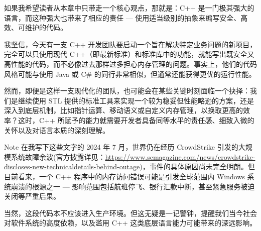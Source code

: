 如果我希望读者从本章中只带走一个核心观点，那就是：C++ 是一门极其强大的语言，而这种强大也带来了相应的责任 --- 使用适当级别的抽象来编写安全、高效、可维护的代码。

我坚信，今天有一支 C++ 开发团队要启动一个旨在解决特定业务问题的新项目，完全可以只使用现代 C++（即最新标准）和标准库中的功能，就能写出既安全又高性能的代码，而不必像过去那样过多担心内存管理的问题。事实上，他们的代码风格可能与使用 Java 或 C\# 的同行非常相似，但通常还能获得更优的运行性能。

然而，即便是这样一支现代化的团队，也可能会在某些关键时刻面临一个抉择：我们是继续使用 STL 提供的标准工具来实现一个较为稳妥但性能略逊的方案，还是深入到底层机制，比如指针运算、移动语义或自定义内存管理，以换取更高的效率？这时，C++ 所赋予的能力就需要开发者具备同等水平的责任感、细致入微的关怀以及对语言本质的深刻理解。

\begin{myNotic}{Note}
在我写下这些文字的 2024 年 7 月，世界仍在经历 CrowdStrike 引发的大规模系统故障余波(官方披露详见：\url{https://www.scmagazine.com/news/crowdstrike-discloses-new-technicaldetails-behind-outage})，事件的具体原因尚未完全明朗。但目前看来，一个 C++ 程序中的内存访问错误可能是引发全球范围内 Windows 系统崩溃的根源之一 --- 影响范围包括航班停飞、银行汇款中断，甚至紧急服务被迫关闭等严重后果。

当然，这段代码本不应该进入生产环境。但这无疑是一记警钟，提醒我们当今社会对软件系统的高度依赖，以及滥用 C++ 这类底层语言能力可能带来的深远影响。
\end{myNotic}